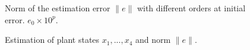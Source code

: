 \documentclass[11pt,letterpaper,twoside,openright]{report}
\providecommand{\norm}[1]{\lVert#1\rVert}
\begin{document}
\begin{figure}[htbp]
	\caption{Norm of the estimation error $\norm{e}$ with different orders at initial error. $e_0\times 10^p$.}
	\label{fig: CH4 Error 4s norm with orders}
\end{figure}

\begin{figure}[htbp]
	\caption{Estimation of plant states $x_1,...,x_4$ and norm  $\norm{e}$.}
	\label{fig: CH4 Error 4s states and norm, e_0 linear}
\end{figure}
\end{document}
